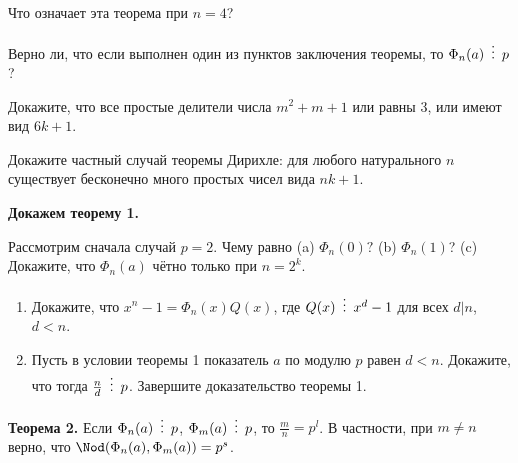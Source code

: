 \documentclass{article}
\begin{document}
    \begin{enumerate_boxed}
        \setcounter{enumi}{10}
        \item Что означает эта теорема при $n = 4$?

        \item Верно ли, что если выполнен один из пунктов заключения теоремы, то $\Phi_n(a) \,\,\,\vdots\,\,\, p$?

        \item Докажите, что все простые делители числа $m^2+m+1$ или равны 3, или имеют вид $6k+1$.


        \item Докажите частный случай теоремы Дирихле: для любого натурального $n$ существует бесконечно много простых чисел вида $nk+1$.

        \textbf{Докажем теорему 1.}
        \item Рассмотрим сначала случай $p = 2$.
        Чему равно (a) $\Phi_n(0)?$ (b) $\Phi_n(1)$? (c) Докажите, что $\Phi_n(a)$ чётно только при $n = 2^k$. %

%

        \item
        \begin{enumerate}
            \item Докажите, что $x^n-1 = \Phi_n(x)Q(x)$, где $Q(x) \,\,\,\vdots\,\,\, x^d - 1$ для всех $d | n$, $d < n$.
            \item Пусть в условии теоремы 1 показатель $a$ по модулю $p$ равен $d < n$.
            Докажите, что тогда $\frac{n}{d} \,\,\,\vdots\,\,\, p$.
            Завершите доказательство теоремы 1.
        \end{enumerate}

        \textbf{Теорема 2.} Если $\Phi_n(a) \,\,\,\vdots\,\,\, p$, $\Phi_m(a) \,\,\,\vdots\,\,\, p$, то $\frac{m}{n} = p^l$.
        В частности, при $m \neq n$ верно, что $\Nod(\Phi_n(a),\Phi_m(a)) = p^s$.


\end{enumerate_boxed}
\end{document}
